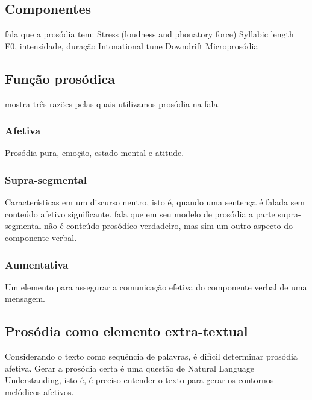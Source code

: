 \subsection{Componentes}
 fala que a prosódia tem:
Stress (loudness and phonatory force)
Syllabic length
F0, intensidade, duração
Intonational tune
Downdrift
Microprosódia
\subsection{Função prosódica}
 mostra três razões pelas quais utilizamos prosódia na fala.
\subsubsection{Afetiva}
Prosódia pura, emoção, estado mental e atitude. 
\subsubsection{Supra-segmental}
Características em um discurso neutro, isto é, quando uma sentença é falada sem
conteúdo afetivo significante.  fala que em seu modelo de
prosódia a parte supra-segmental não é conteúdo prosódico verdadeiro, mas sim
um outro aspecto do componente verbal.
\subsubsection{Aumentativa}
Um elemento para assegurar a comunicação efetiva do componente verbal de uma mensagem.
\subsection{Prosódia como elemento extra-textual}
Considerando o texto como sequência de palavras, é difícil determinar prosódia
afetiva.
Gerar a prosódia certa é uma questão de Natural Language Understanding, isto é,
é preciso entender o texto para gerar os contornos melódicos afetivos.